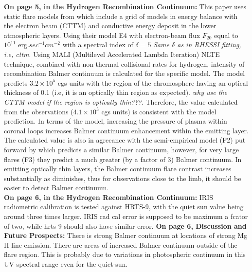 \documentclass[11pt]{article}
\begin{document}
\textbf{On page 5, in the Hydrogen Recombination Continuum: } This paper uses static flare models from \cite{1983ApJ...272..739R} which include a grid of models in energy balance with the electron beam (CTTM) and conductive energy deposit in the lower atmospheric layers. Using their model E4 with electron-beam flux $F_{20}$ equal to $10^{11}$ erg.$sec^{-1}cm^{-2}$ with a spectral index of $\delta = 5$ \emph{Same $\delta$ as in RHESSI fitting, i.e, cttm}. Using MALI (Multilevel Accelerated Lambda Iteration) NLTE technique, combined with non-thermal collisional rates for hydrogen, intensity of recombination Balmer continuum is calculated for the specific model. The model predicts $3.2{\times}10^{5}$ cgs units with the region of the chromosphere having an optical thickness of 0.1 (i.e, it is an optically thin region as expected). \emph{why use the CTTM model if the region is optically thin???}. Therefore, the value calculated from the observations ($4.1{\times}10^{5}$ cgs units) is consistent with the model prediction. In terms of the model, increasing the pressure of plasma within coronal loops increases Balmer continuum enhancement within the emitting layer. The calculated value is also in agreeance with the semi-empirical model (F2) put forward by \cite{1986lasf.conf..216A} which predicts a similar Balmer continuum, however, for very large flares (F3) they predict a much greater (by a factor of 3) Balmer continuum. In emitting optically thin layers, the Balmer continuum flare contrast increases substantially as \mu diminishes, thus for observations close to the limb, it should be easier to detect Balmer continuum.  \\
\textbf{On page 6, in the Hydrogen Recombination Continuum: } IRIS radiometric calibration is tested against HRTS-9, with the quiet sun value being around three times larger. IRIS rad cal error is supposed to be maximum a fcator of two, while hrts-9 should also have similar error.
\textbf{On page 6, Discussion and Future Prospects: }
There is strong Balmer continuum at locations of strong Mg II line emission. There are areas of increased Balmer continuum outside of the flare region. This is probably due to variations in photospheric continuum in this UV spectral range even for the quiet-sun. 
\end{document}

